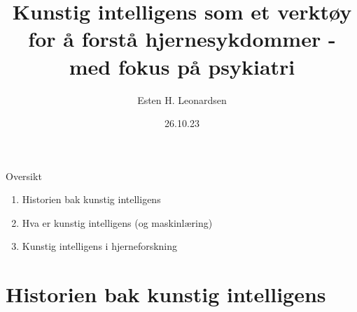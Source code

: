 \documentclass[8pt]{beamer}
\title{Kunstig intelligens som et verktøy for å forstå hjernesykdommer - med fokus på psykiatri}
\author{Esten H. Leonardsen}
\date{26.10.23}
\begin{document}
	\begin{frame}
	 	\titlepage
	\end{frame}

    \begin{frame}{Oversikt}
        \begin{enumerate}
            \item Historien bak kunstig intelligens
            \item Hva er kunstig intelligens (og maskinlæring)
            \item Kunstig intelligens i hjerneforskning
        \end{enumerate}
    \end{frame}

	\section{Historien bak kunstig intelligens}

\end{document}
